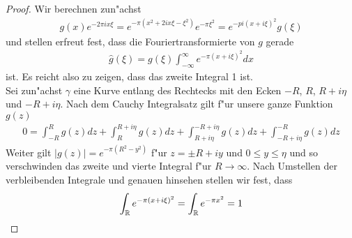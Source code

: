 \begin{proof}
	Wir berechnen zun"achst
	\begin{align*}
		g(x)e^{-2\pi i x \xi} = e^{-\pi(x^2 +2 i x \xi - \xi ^2)}e^{-\pi \xi^2} = e^{-pi (x + i \xi)^2} g(\xi)
	\end{align*}
	und stellen erfreut fest, dass die Fouriertransformierte von $g$ gerade
	\begin{align*}
		\hat{g}(\xi) = g(\xi) \int_{-\infty}^{\infty} e^{-\pi(x+i\xi)^2}dx
	\end{align*}
	ist. Es reicht also zu zeigen, dass das zweite Integral 1 ist.\\
	Sei zun"achst $\gamma$ eine Kurve entlang des Rechtecks mit den Ecken $-R$, $R$, $R+i\eta$ und $-R+i\eta$. Nach dem Cauchy Integralsatz gilt f"ur unsere ganze Funktion $g(z)$
	\begin{align*}
		0 = \int_{-R}^{R} {g(z)dz} + \int_{R}^{R+i\eta} {g(z)dz}  + \int_{R+i\eta}^{-R+i\eta} {g(z)dz}  + \int_{-R+i\eta}^{-R} {g(z)dz} 
	\end{align*}
	Weiter gilt $|g(z)|=e^{-\pi (R^2 - y^2)}$ f"ur $z=\pm R + i y$ und $0\leq y \leq \eta$ und so verschwinden das zweite und vierte Integral f"ur $R\rightarrow \infty$. Nach Umstellen der verbleibenden Integrale und genauen hinsehen stellen wir fest, dass
	\begin{align*}
		\int_{\mathbb{R}}{e^{-\pi (x + i\xi)^2}} = \int_{\mathbb{R}} {e^{-\pi x^2} = 1}
	\end{align*}
\end{proof}